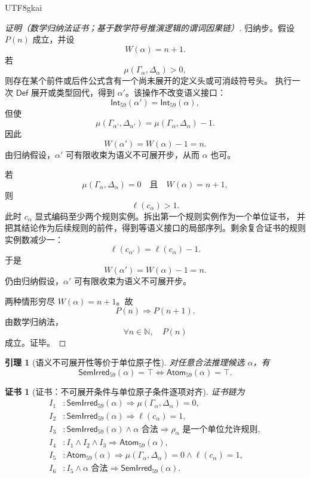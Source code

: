 \documentclass[12pt]{article}
\newtheorem{lemma}{引理}[section]
\newtheorem{Certificate}{证书}[section]
\newcommand{\NN}{\mathbb{N}}
\begin{document}
\begin{CJK*}{UTF8}{gkai}
\begin{proof}[证明（数学归纳法证书；基于数学符号推演逻辑的谓词因果链）]
归纳步。假设 \(P(n)\) 成立，并设
\[
  W(\alpha)=n+1.
\]
若
\[
  \mu(\Gamma_{\alpha},\Delta_{\alpha})>0,
\]
则存在某个前件或后件公式含有一个尚未展开的定义头或可消歧符号头。
执行一次 \(\mathsf{Def}\) 展开或类型回代，得到 \(\alpha'\)。该操作不改变语义接口：
\[
  \mathsf{Int}_{59}(\alpha')
  =
  \mathsf{Int}_{59}(\alpha),
\]
但使
\[
  \mu(\Gamma_{\alpha'},\Delta_{\alpha'})
  =
  \mu(\Gamma_{\alpha},\Delta_{\alpha})-1.
\]
因此
\[
  W(\alpha')=W(\alpha)-1=n.
\]
由归纳假设，\(\alpha'\) 可有限收束为语义不可展开步，从而 \(\alpha\) 也可。

若
\[
  \mu(\Gamma_{\alpha},\Delta_{\alpha})=0
  \quad\text{且}\quad
  W(\alpha)=n+1,
\]
则
\[
  \ell(c_{\alpha})>1.
\]
此时 \(c_{\alpha}\) 显式编码至少两个规则实例。拆出第一个规则实例作为一个单位证书，
并把其结论作为后续规则的前件，得到等语义接口的局部序列。剩余复合证书的规则实例数减少一：
\[
  \ell(c_{\alpha'})=\ell(c_{\alpha})-1.
\]
于是
\[
  W(\alpha')=W(\alpha)-1=n.
\]
仍由归纳假设，\(\alpha'\) 可有限收束为语义不可展开步。

两种情形穷尽 \(W(\alpha)=n+1\)。故
\[
  P(n)\Rightarrow P(n+1).
\]
由数学归纳法，
\[
  \forall n\in\NN,\quad P(n)
\]
成立。证毕。
\end{proof}

\begin{lemma}[语义不可展开性等价于单位原子性]
\label{lem:tex59-semantic-irreducible-iff-atomic}
对任意合法推理候选 \(\alpha\)，有
\[
  \mathsf{SemIrred}_{59}(\alpha)=\top
  \Longleftrightarrow
  \mathsf{Atom}_{59}(\alpha)=\top.
\]
\end{lemma}

\begin{Certificate}[证书：不可展开条件与单位原子条件逐项对齐]
\label{cert:tex59-semantic-irreducible-iff-atomic}
证书链为
\[
\begin{aligned}
  I_1 &: \mathsf{SemIrred}_{59}(\alpha)
         \Rightarrow
         \mu(\Gamma_{\alpha},\Delta_{\alpha})=0,\\
  I_2 &: \mathsf{SemIrred}_{59}(\alpha)
         \Rightarrow
         \ell(c_{\alpha})=1,\\
  I_3 &: \mathsf{SemIrred}_{59}(\alpha)\wedge\alpha\text{ 合法}
         \Rightarrow
         \rho_{\alpha}\text{ 是一个单位允许规则},\\
  I_4 &: I_1\wedge I_2\wedge I_3
         \Rightarrow
         \mathsf{Atom}_{59}(\alpha),\\
  I_5 &: \mathsf{Atom}_{59}(\alpha)
         \Rightarrow
         \mu(\Gamma_{\alpha},\Delta_{\alpha})=0
         \wedge
         \ell(c_{\alpha})=1,\\
  I_6 &: I_5\wedge\alpha\text{ 合法}
         \Rightarrow
         \mathsf{SemIrred}_{59}(\alpha).
\end{aligned}
\]
\end{Certificate}


\end{CJK*}
\end{document}

